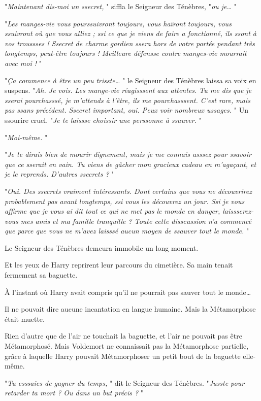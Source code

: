 "\emph{Maintenant dis-moi un ssecret,} " siffla le Seigneur des Ténèbres, "\emph{ou je…} "

"\emph{Les manges-vie vous pourssuivront toujours, vous haïront toujours, vous ssuivront où que vous alliez ; ssi ce que je viens de faire a fonctionné, ils ssont à vos troussses ! Ssecret de charme gardien ssera hors de votre portée pendant très longtemps, peut-être toujours ! Meilleure défensse contre manges-vie mourrait avec moi !} "

"\emph{Ça commence à être un peu trisste…} " le Seigneur des Ténèbres laissa sa voix en suspens. "\emph{Ah. Je vois. Les mange-vie réagisssent aux attentes. Tu me dis que je sserai pourchasssé, je m'attends à l'être, ils me pourchasssent. C'est rare, mais pas ssans précédent. Ssecret important, oui. Peux voir nombreux ussages.} " Un ssourire cruel. "\emph{Je te laissse choissir une perssonne à ssauver.} "

"\emph{Moi-même.} "

"\emph{Je te dirais bien de mourir dignement, mais je me connais asssez pour ssavoir que ce sserait en vain. Tu viens de gâcher mon gracieux cadeau en m'agaçant, et je le reprends. D'autres ssecrets ?} "

"\emph{Oui. Des ssecrets vraiment intéressants. Dont certains que vous ne découvrirez probablement pas avant longtemps, ssi vous les découvrez un jour. Ssi je vous affirme que je vous ai dit tout ce qui ne met pas le monde en danger, laissserez-vous mes amis et ma famille tranquille ? Toute cette disscussion n'a commencé que parce que vous ne m'avez laisssé aucun moyen de ssauver tout le monde.} "

Le Seigneur des Ténèbres demeura immobile un long moment.

Et les yeux de Harry reprirent leur parcours du cimetière. Sa main tenait fermement sa baguette.

À l'instant où Harry avait compris qu'il ne pourrait pas sauver tout le monde…

Il ne pouvait dire aucune incantation en langue humaine. Mais la Métamorphose était muette.

Rien d'autre que de l'air ne touchait la baguette, et l'air ne pouvait pas être Métamorphosé. Mais Voldemort ne connaissait pas la Métamorphose partielle, grâce à laquelle Harry pouvait Métamorphoser un petit bout de la baguette elle-même.

"\emph{Tu esssaies de gagner du temps,} " dit le Seigneur des Ténèbres. "\emph{Jusste pour retarder ta mort ? Ou dans un but précis ?} "

